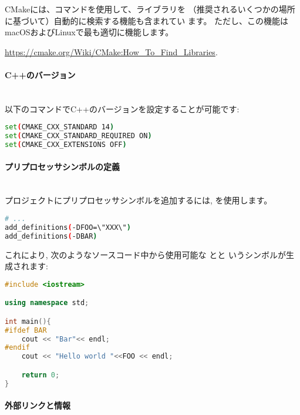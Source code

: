 \documentclass[uplatex,11pt,a4paper,landscape,dvipdfmx]{jsarticle} %
\newcommand{\sectiontitle}[1]{\paragraph{#1} \ \\} %
\begin{document}
\begin{multicols}{2}
CMakeには、コマンドを使用して、ライブラリを
（推奨されるいくつかの場所に基づいて）自動的に検索する機能も含まれてい
ます。 ただし、この機能はmacOSおよびLinuxで最も適切に機能します。

\url{https://cmake.org/Wiki/CMake:How_To_Find_Libraries}.

\sectiontitle{C++のバージョン}

以下のコマンドでC++のバージョンを設定することが可能です:

\begin{lstlisting}[language=bash]
set(CMAKE_CXX_STANDARD 14)
set(CMAKE_CXX_STANDARD_REQUIRED ON)
set(CMAKE_CXX_EXTENSIONS OFF)
\end{lstlisting}

\sectiontitle{プリプロセッサシンボルの定義}

プロジェクトにプリプロセッサシンボルを追加するには,
 を使用します。

\begin{lstlisting}[language=bash]
# ...
add_definitions(-DFOO=\"XXX\")
add_definitions(-DBAR)
\end{lstlisting}

これにより, 次のようなソースコード中から使用可能な とと
いうシンボルが生成されます:

\begin{lstlisting}[language=c++]
#include <iostream>

using namespace std;

int main(){
#ifdef BAR
    cout << "Bar"<< endl;
#endif
    cout << "Hello world "<<FOO << endl;

    return 0;
}
\end{lstlisting}

\vspace{\baselineskip} %


\sectiontitle{外部リンクと情報}


\end{multicols}
\end{document}
